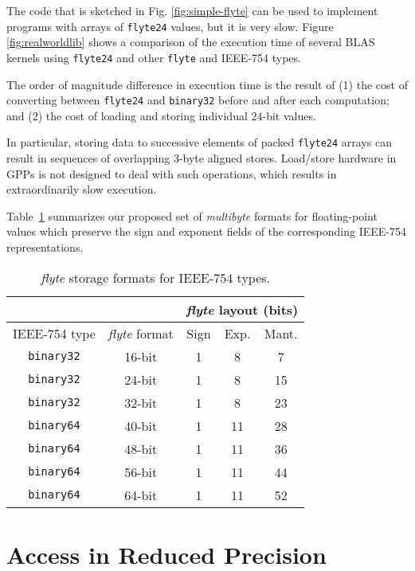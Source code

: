 \documentclass{sig-alternate-05-2015}
\newcommand{\mt}[1]{\texttt{#1}}
\begin{document}
\noindent The code that is sketched in Fig. \ref{fig:simple-flyte} can be used
to implement programs with arrays of \mt{flyte24} values, but it is very slow.
Figure \ref{fig:realworldlib} shows a comparison of the execution time of
several BLAS kernels using \mt{flyte24} and other \mt{flyte} and IEEE-754
types.

The order of magnitude difference in execution time is the result of (1) the
cost of converting between \mt{flyte24} and \mt{binary32} before and after each
computation; and (2) the cost of loading and storing individual 24-bit values.

In particular, storing data to successive elements of packed \mt{flyte24}
arrays can result in sequences of overlapping 3-byte aligned stores. Load/store
hardware in GPPs is not designed to deal with such operations, which results in
extraordinarily slow execution.

Table~\ref{table:formats} summarizes our
proposed set of \emph{multibyte} formats for floating-point values which
preserve the sign and exponent fields of the corresponding IEEE-754
representations.



\begin{table}[h]
  \caption{\textit{flyte} storage formats for IEEE-754 types.}
  \centering
  \begin{tabular}{ccccc}
    \hfill & \hfill & \multicolumn{3}{c}{\textit{flyte} layout (bits)} \\
    \toprule
    IEEE-754 type & \textit{flyte} format & Sign & Exp. & Mant. \\
    \midrule
    \mt{binary32} & 16-bit  & 1& 8& 7\\
    \mt{binary32} & 24-bit  & 1& 8& 15\\
    \mt{binary32} & 32-bit  & 1& 8& 23\\
    \midrule
    \mt{binary64} & 40-bit & 1& 11& 28\\
    \mt{binary64} & 48-bit & 1& 11& 36\\
    \mt{binary64} & 56-bit & 1& 11& 44\\
    \mt{binary64} & 64-bit & 1& 11& 52\\
    \bottomrule
  \end{tabular}
  \label{table:formats}
\end{table}



\section{Access in Reduced Precision}
\label{sec:rw}
\end{document}
